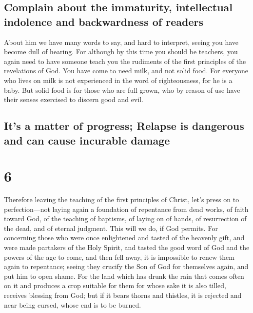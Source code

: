 \hypertarget{complain-about-the-immaturity-intellectual-indolence-and-backwardness-of-readers}{%
\subsection{Complain about the immaturity, intellectual indolence and
backwardness of
readers}\label{complain-about-the-immaturity-intellectual-indolence-and-backwardness-of-readers}}

 About him we have many words to say, and hard to
interpret, seeing you have become dull of hearing.  For
although by this time you should be teachers, you again need to have
someone teach you the rudiments of the first principles of the
revelations of God. You have come to need milk, and not solid food.
 For everyone who lives on milk is not experienced in the
word of righteousness, for he is a baby.  But solid food
is for those who are full grown, who by reason of use have their senses
exercised to discern good and evil.

\hypertarget{its-a-matter-of-progress-relapse-is-dangerous-and-can-cause-incurable-damage}{%
\subsection{It's a matter of progress; Relapse is dangerous and can
cause incurable
damage}\label{its-a-matter-of-progress-relapse-is-dangerous-and-can-cause-incurable-damage}}

\hypertarget{section-5}{%
\section{6}\label{section-5}}

 Therefore leaving the teaching of the first principles of
Christ, let's press on to perfection---not laying again a foundation of
repentance from dead works, of faith toward God,  of the
teaching of baptisms, of laying on of hands, of resurrection of the
dead, and of eternal judgment.  This will we do, if God
permits.  For concerning those who were once enlightened
and tasted of the heavenly gift, and were made partakers of the Holy
Spirit,  and tasted the good word of God and the powers of
the age to come,  and then fell away, it is impossible to
renew them again to repentance; seeing they crucify the Son of God for
themselves again, and put him to open shame.  For the land
which has drunk the rain that comes often on it and produces a crop
suitable for them for whose sake it is also tilled, receives blessing
from God;  but if it bears thorns and thistles, it is
rejected and near being cursed, whose end is to be burned.

